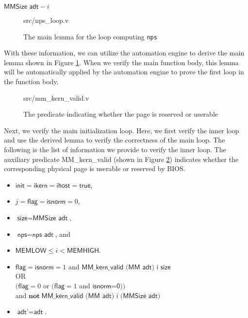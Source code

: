 \begin{definition}
$\textsf{MMSize adt}-i$
\end{definition}

\begin{figure}
	 {src/nps_loop.v}
	\caption{The main lemma for the loop computing \texttt{nps}}
	\label{fig:nps_loop_v}
\end{figure}

With these information, we can utilize the automation engine to derive the main lemma shown in Figure \ref{fig:nps_loop_v}.
When we verify the main function body, this lemma will be automatically applied by the automation engine to prove
the first loop in the function body.

\begin{figure}
	 {src/mm_kern_valid.v}
	\caption{The predicate indicating whether the page is reserved or userable}
	\label{fig:mm_kern_valid_v}
\end{figure}

Next, we verify the main initialization loop. Here, we first verify the inner loop and use the derived lemma to verify the
correctness of the main loop. The following is the list of information we provide to verify the inner loop.
The auxiliary predicate \textsf{MM\_kern\_valid} (shown in Figure \ref{fig:mm_kern_valid_v}) indicates whether
the corresponding physical page is userable or reserved by BIOS.

\begin{definition}[Precondition] 
\begin{itemize}
\item $\textsf{init} = \textsf{ikern} = \textsf{ihost} = \textsf{true}$,
\item $j=\textsf{flag}=\textsf{isnorm}=0$,
\item $\textsf{size}=\textsf{MMSize adt}$,
\item $\textsf{nps}=\textsf{nps adt}$, and
\item $\textsf{MEMLOW}\le i < \textsf{MEMHIGH}$.
\end{itemize}
\end{definition}

\begin{definition}[Postcondition] 
\begin{itemize}
\item $\textsf{flag}=\textsf{isnorm}=1$ and $\textsf{MM\_kern\_valid (MM adt) i size}$\\OR\\
$(\textsf{flag}=0$ or $(\textsf{flag}=1$ and $\textsf{isnorm=0}))$\\ and $\textbf{not}~\textsf{MM\_kern\_valid (MM adt) i (MMSize adt)}$
\item $\textsf{adt'}=\textsf{adt}$.
\end{itemize}
\end{definition}

